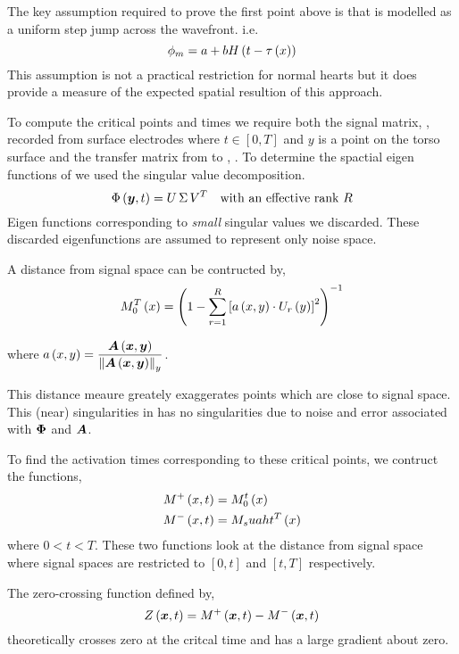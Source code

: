 The key assumption required to prove the first point above is that
\tranpot is modelled as a uniform step jump across the wavefront.
i.e.
\begin{equation}
        \phi_m = a + b  H\left( t- \tau\left( x \right)  \right) 
\end{equation}
This assumption is not a
practical restriction for normal hearts but it does provide a measure of
the expected spatial resultion of this approach.

To compute the critical points and times we require both the signal
matrix, \PHI, recorded from surface electrodes where $t \in [0,T]$
and $y$ is a point on the torso surface and the transfer matrix from \tranpot
to \bodypot, \transfer. To determine the spactial eigen
functions of \PHI we used the singular value decomposition.
\begin{equation}
  \PHI = U \thinspace \Sigma \thinspace  V^T \quad \text{with an effective rank $R$}
\end{equation}
Eigen functions corresponding to \emph{small} singular values we discarded.
These discarded eigenfunctions are assumed to represent only noise space.

A distance from signal space can be contructed by,
\begin{equation}
   {M}_0^T\left( x \right)  = \left( 1-
         \displaystyle\sum_{r=1}^{R}  \left[  a\left( x,y \right)  \cdot  U_r\left( y \right)  \right]^2  \right)^{-1}
\end{equation}

where $\fnof{a}{x,y} = \dfrac{\transfer}{\lnorm{y}{\transfer}}$.

This distance meaure greately exaggerates points  which are close
to signal space. This (near) singularities in  has no
singularities due to noise and error associated with $\matr{\Phi}$ and $\matr{A}$.


To find the activation times corresponding to these critical points, we
contruct the functions,
\begin{align}
   M^+\left( x,t \right)  &=  M_0^t\left( x \right)  \\
   M^-\left( x,t \right)  &=  M_suaht^T\left( x \right) 
\end{align}
where $0<t<T$. These two functions look at the distance from signal space
where signal spaces are restricted to $[0,t]$ and $[t,T]$ respectively.

The zero-crossing function defined by,
\begin{equation}
        \ZCROSS=\fnof{M^+}{\vect{x},t}-\fnof{M^-}{\vect{x},t}
\end{equation}
theoretically crosses zero at the critcal time and has a large gradient
about zero.

